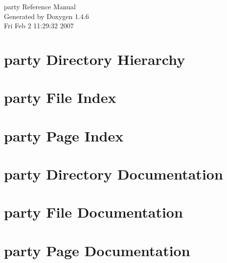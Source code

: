 \documentclass[a4paper]{book}
\begin{document}
\begin{titlepage}
\vspace*{7cm}
\begin{center}
{\Large party Reference Manual}\\
\vspace*{1cm}
{\large Generated by Doxygen 1.4.6}\\
\vspace*{0.5cm}
{\small Fri Feb 2 11:29:32 2007}\\
\end{center}
\end{titlepage}
\clearemptydoublepage
{}
\tableofcontents
\clearemptydoublepage
{}
\chapter{party Directory Hierarchy}

\chapter{party File Index}

\chapter{party Page Index}

\chapter{party Directory Documentation}

\chapter{party File Documentation}





























\chapter{party Page Documentation}

\printindex
\end{document}
